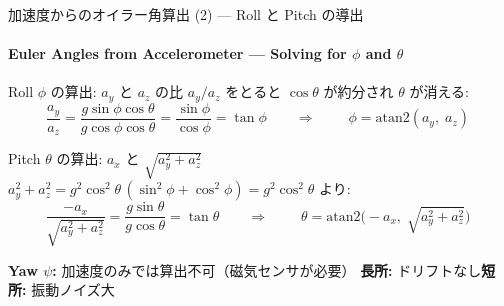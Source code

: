 \documentclass[aspectratio=169, 14pt]{beamer}
\begin{document}
\begin{frame}{加速度からのオイラー角算出 (2) --- Roll と Pitch の導出}
  \framesubtitle{Euler Angles from Accelerometer --- Solving for $\phi$ and $\theta$}

  \begin{block}{Roll $\phi$ の算出: $a_y$ と $a_z$ の比}
    {\small
    $a_y / a_z$ をとると $\cos\theta$ が約分され $\theta$ が消える:
    }
    \vspace{-0.5em}
    {\footnotesize
    \[
    \frac{a_y}{a_z}
    = \frac{g\sin\phi\cos\theta}{g\cos\phi\cos\theta}
    = \frac{\sin\phi}{\cos\phi}
    = \tan\phi
    \qquad\Longrightarrow\qquad
    \boxed{\;\phi = \mathrm{atan2}(a_y,\; a_z)\;}
    \]
    }
  \end{block}

  \vspace{-0.5em}

  \begin{block}{Pitch $\theta$ の算出: $a_x$ と $\sqrt{a_y^2 + a_z^2}$}
    {\small
    $a_y^2 + a_z^2 = g^2\cos^2\!\theta\,(\sin^2\!\phi + \cos^2\!\phi) = g^2\cos^2\!\theta$ より:
    }
    \vspace{-0.5em}
    {\footnotesize
    \[
    \frac{-a_x}{\sqrt{a_y^2 + a_z^2}}
    = \frac{g\sin\theta}{g\cos\theta}
    = \tan\theta
    \qquad\Longrightarrow\qquad
    \boxed{\;\theta = \mathrm{atan2}\!\bigl(-a_x,\;\sqrt{a_y^2 + a_z^2}\bigr)\;}
    \]
    }
  \end{block}

  \vspace{-0.3em}

  {\scriptsize
    \textbf{Yaw $\psi$:} 加速度のみでは算出不可（磁気センサが必要）\quad
    \textbf{長所:} ドリフトなし\quad \textbf{短所:} 振動ノイズ大
  }
\end{frame}
\end{document}
